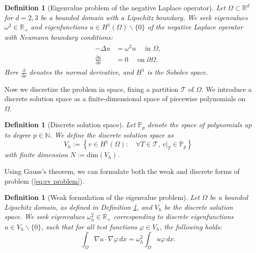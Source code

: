 \documentclass[a4paper,11pt,bibliography=totoc,listof=totoc,headinclude=true,cleardoublepage=empty,oneside]{scrbook}
\newtheorem{definition}[theorem]{Definition}
\newcommand{\R}{\mathbb{R}}
\newcommand{\N}{\mathbb{N}}
\renewcommand{\eqref}[1]{(\ref{#1})}
\begin{document}
\begin{definition}[Eigenvalue problem of the negative Laplace operator]\label{def:ev problem}
    Let $\Omega \subset \R^d$ for $d=2,3$ be a bounded domain with a Lipschitz boundary. We seek eigenvalues $\omega^2 \in \R_{+}$ and eigenfunctions $u\in H^1(\Omega)\backslash \{0\}$ of the negative Laplace operator with Neumann boundary conditions:
        \begin{align}\begin{split}\label{eq:ev problem}
              -\Delta u &= \omega^2 u \quad \text{ in } \Omega, \\
              \frac{\partial u}{\partial \nu} &= 0 \quad\text{ on } \partial\Omega.
        \end{split}\end{align}
    Here $\frac{\partial}{\partial\nu}$ denotes the normal derivative, and $H^1$ is the Sobolev space.
\end{definition}
Now we discretize the problem in space, fixing a partition $\mathcal{T}$ of $\Omega$. We introduce a discrete solution space as a finite-dimensional space of piecewise polynomials on $\Omega$.
\begin{definition}[Discrete solution space]\label{def:solution space}
Let $\mathbb{P}_p$ denote the space of polynomials up to degree $p \in \N$. We define the discrete solution space as
\begin{equation*}
V_h := \left\{v \in H^1(\Omega): \quad \forall T \in \mathcal{T}, \, v|_T \in \mathbb{P}_p \right\}
\end{equation*}
with finite dimension $N := \mathrm{dim} (V_h)$.
\end{definition}

Using Gauss's theorem, we can formulate both the weak and discrete forms of problem \eqref{eq:ev problem}.

\begin{definition}[Weak formulation of the eigenvalue problem]\label{def:weak form}
Let $\Omega$ be a bounded Lipschitz domain, as defined in Definition \ref{def:ev problem}, and $V_h$ be the discrete solution space. We seek eigenvalues $\omega_h^2 \in \R_+$ corresponding to discrete eigenfunctions $u \in V_h\backslash\{0\}$, such that for all test functions $\varphi \in V_h$, the following holds:
\begin{equation}\label{eq:weak form}
\int_\Omega \nabla u \cdot \nabla \varphi \, dx = \omega_h^2 \int_\Omega u \varphi \, dx.
\end{equation}
\end{definition}
\end{document}
